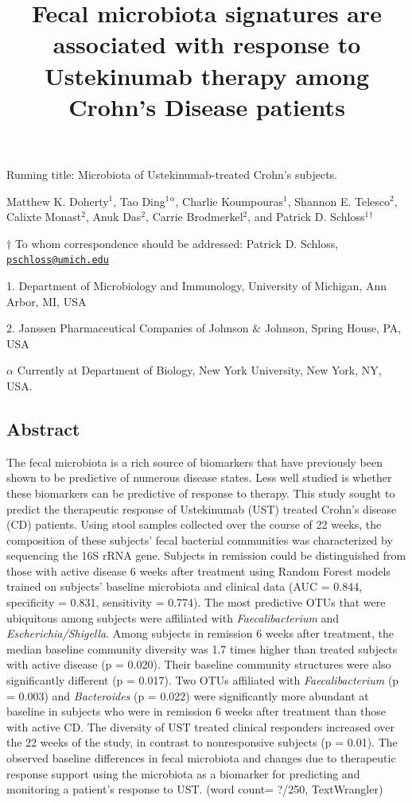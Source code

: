 \documentclass[12pt,]{article}
\title{Fecal microbiota signatures are associated with response to Ustekinumab
therapy among Crohn's Disease patients}
\author{}
\date{}
\begin{document}
\maketitle

\vspace{35mm}

Running title: Microbiota of Ustekinumab-treated Crohn's subjects.

\vspace{35mm} Matthew K. Doherty\({^1}\), Tao Ding\({^1}\)\({^\alpha}\),
Charlie Koumpouras\({^1}\), Shannon E. Telesco\({^2}\), Calixte
Monast\({^2}\), Anuk Das\({^2}\), Carrie Brodmerkel\({^2}\), and Patrick
D. Schloss\({^1}\)\({^\dagger}\)

\(\dagger\) To whom correspondence should be addressed: Patrick D.
Schloss,
\href{mailto:pschloss@umich.edu}{\nolinkurl{pschloss@umich.edu}}

1. Department of Microbiology and Immunology, University of Michigan,
Ann Arbor, MI, USA

2. Janssen Pharmaceutical Companies of Johnson \({\&}\) Johnson, Spring
House, PA, USA

\({\alpha}\) Currently at Department of Biology, New York University,
New York, NY, USA.

\newpage

\subsection{Abstract}\label{abstract}

The fecal microbiota is a rich source of biomarkers that have previously
been shown to be predictive of numerous disease states. Less well
studied is whether these biomarkers can be predictive of response to
therapy. This study sought to predict the therapeutic response of
Ustekinumab (UST) treated Crohn's disease (CD) patients. Using stool
samples collected over the course of 22 weeks, the composition of these
subjects' fecal bacterial communities was characterized by sequencing
the 16S rRNA gene. Subjects in remission could be distinguished from
those with active disease 6 weeks after treatment using Random Forest
models trained on subjects' baseline microbiota and clinical data (AUC =
0.844, specificity = 0.831, sensitivity = 0.774). The most predictive
OTUs that were ubiquitous among subjects were affiliated with
\emph{Faecalibacterium} and \emph{Escherichia/Shigella}. Among subjects
in remission 6 weeks after treatment, the median baseline community
diversity was 1.7 times higher than treated subjects with active disease
(p = 0.020). Their baseline community structures were also significantly
different (p = 0.017). Two OTUs affiliated with \emph{Faecalibacterium}
(p = 0.003) and \emph{Bacteroides} (p = 0.022) were significantly more
abundant at baseline in subjects who were in remission 6 weeks after
treatment than those with active CD. The diversity of UST treated
clinical responders increased over the 22 weeks of the study, in
contrast to nonresponsive subjects (p = 0.01). The observed baseline
differences in fecal microbiota and changes due to therapeutic response
support using the microbiota as a biomarker for predicting and
monitoring a patient's response to UST. (word count= ?/250,
TextWrangler)
\end{document}
